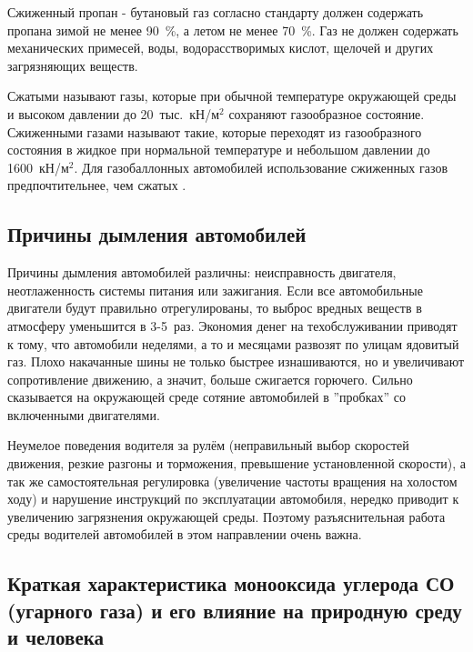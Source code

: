 Сжиженный пропан - бутановый газ согласно стандарту должен содержать пропана зимой не менее 90~\%, а летом не менее 70~\%. Газ не должен содержать механических примесей, воды, водорасстворимых кислот, щелочей и других загрязняющих веществ.

Сжатыми называют газы, которые при обычной температуре окружающей среды и высоком давлении до 20~тыс.~кН/м$^2$ сохраняют газообразное состояние.
Сжиженными газами называют такие, которые переходят из газообразного состояния в жидкое при нормальной температуре и небольшом давлении до 1600~кН/м$^2$.
Для газобаллонных автомобилей использование сжиженных газов предпочтительнее, чем сжатых 
\cite{mihailovsky}.










\newpage
\subsection{Причины дымления автомобилей}

Причины дымления автомобилей различны: неисправность двигателя, неотлаженность системы питания или зажигания. Если все автомобильные двигатели будут правильно отрегулированы, то выброс вредных веществ в атмосферу уменьшится в 3-5~раз. Экономия денег на техобслуживании приводят к тому, что автомобили неделями, а то и месяцами развозят по улицам ядовитый газ. Плохо накачанные шины не только быстрее изнашиваются, но и увеличивают сопротивление движению, а значит, больше сжигается горючего. Сильно сказывается на окружающей среде сотяние автомобилей в ''пробках'' со включенными двигателями.

Неумелое поведения водителя за рулём (неправильный выбор скоростей движения, резкие разгоны и торможения, превышение установленной скорости), а так же самостоятельная регулировка (увеличение частоты вращения на холостом ходу) и нарушение инструкций по эксплуатации автомобиля, нередко приводит к увеличению загрязнения окружающей среды. Поэтому разъяснительная работа среды водителей автомобилей в этом направлении очень важна.









\subsection{Краткая характеристика монооксида углерода СО (угарного газа) и его влияние на природную среду и человека}

